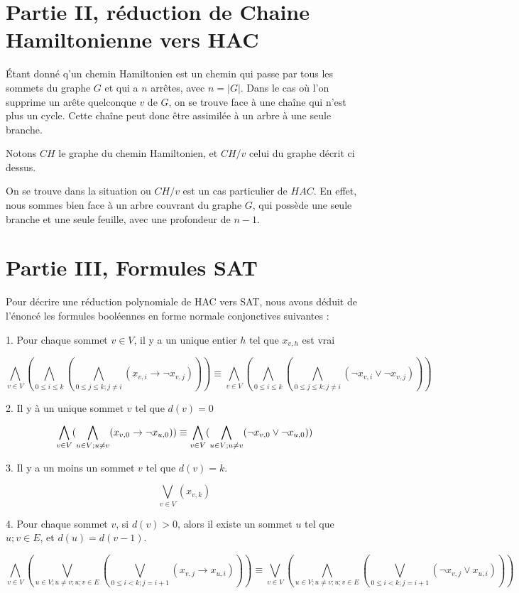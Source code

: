 \documentclass{article}
\begin{document}
\section{Partie II, réduction de Chaine Hamiltonienne vers HAC}

Étant donné q'un chemin Hamiltonien est un chemin qui passe par tous les sommets du graphe $G$ et qui a $n$ arrêtes, avec $n = |G|$. Dans le cas où l'on supprime un arête quelconque $v$ de $G$, on se trouve face à une chaîne qui n'est plus un cycle.
Cette chaîne peut donc être assimilée à un arbre à une seule branche.

Notons $CH$ le graphe du chemin Hamiltonien, et $CH / {v}$ celui du graphe décrit ci dessus.

\smallbreak

On se trouve dans la situation ou $CH / {v}$ est un cas particulier de $HAC$. En effet, nous sommes bien face à un arbre couvrant du graphe $G$, qui possède une seule branche et une seule feuille, avec une profondeur de $n-1$.


\section{Partie III, Formules SAT}

Pour décrire une réduction polynomiale de HAC vers SAT, nous avons déduit de l'énoncé les formules booléennes en forme normale conjonctives suivantes : 

\bigbreak

1. Pour chaque sommet $v \in V$, il y a un unique entier $h$ tel que $x_{v,h}$ est vrai

$$ \bigwedge\limits_{v \in V} (\bigwedge\limits_{0 \leq i \leq k} (\bigwedge\limits_{0 \leq j \leq k; j \neq i}(x_{v,i} \rightarrow \neg x_{v,j}))) \equiv \bigwedge\limits_{v \in V} (\bigwedge\limits_{0 \leq i \leq k} (\bigwedge\limits_{0 \leq j \leq k; j \neq i}(\neg x_{v,i} \lor \neg x_{v,j}))) $$


2. Il y à un unique sommet $ v $ tel que $d(v) = 0$

$$ \bigwedge\limits_{v \in V} (\bigwedge\limits_{u \in V;\\ u \neq v} (x_{v,0} \rightarrow \neg x_{u,0})) \equiv \bigwedge\limits_{v \in V} (\bigwedge\limits_{u \in V;\\ u \neq v} (\neg x_{v,0} \lor \neg x_{u,0})) $$

3. Il y a un moins un sommet $v$ tel que $d(v)=k$.

$$ \bigvee\limits_{v\in V}(x_{v,k}) $$


4. Pour chaque sommet $v$, si $d(v) > 0$, alors il existe un sommet $u$ tel que ${u;v}\in E$, et $d(u)=d(v-1)$.

$$ \bigwedge\limits_{v \in V} (\bigvee\limits_{u \in V; u \neq v; {u;v}\in E} (\bigvee\limits_{0 \leq i < k; j = i+1}(x_{v,j} \rightarrow x_{u,i}))) \equiv \bigvee\limits_{v \in V} (\bigwedge\limits_{u \in V; u \neq v; {u;v}\in E} (\bigvee\limits_{0 \leq i < k; j = i+1}(\neg x_{v,j} \lor x_{u,i}))) $$
\end{document}
